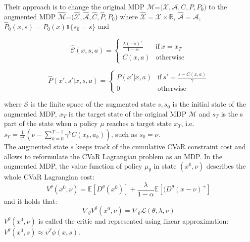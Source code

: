 Their approach is to change the original MDP $\mathcal{M}$=$\mathcal{(X,A},C,P,P_0)$
to the augmented MDP $\mathcal{\hat{M}}$=$\mathcal{(\hat{X},\hat{A}},\hat{C},\hat{P},\hat{P}_0)$ 
where $\mathcal{\hat{X}=X} \times \mathbb R$, $\mathcal{\hat{A}=A}$, $\hat{P}_0(x,s)=P_0(x)\mathds{1}\{s_0=s\}$ and

\begin{equation}
    \mathcal{\hat{C}}(x,s,a)  = \left\{
	    \begin{array}{ll}
		 \frac{\lambda(-s)^+}{1-\alpha}      & \mathrm{if\ } x=x_T \\
		 C(x,a)                                & \mathrm{otherwise }
	    \end{array}
	     \right.
\end{equation}

\begin{equation}
    \hat{P}(x',s'|x,s,a)  = \left\{
	    \begin{array}{ll}
		 P(x'|x,a)      & \mathrm{if\ } s'=\frac{s-C(x,a)}{\gamma} \\
		 0                           & \mathrm{otherwise }
	    \end{array}
	     \right.
\end{equation}

where $\mathcal{S}$ is the finite space of the augmented state $s, s_0$ is the initial state of the augmented
MDP, $x_T$ is the target state of the original MDP $\mathcal{M}$ and $s_T$ is the s part of the state when a policy $\mu$
reaches a target state $x_T$, i.e. $s_T=\frac{1}{\gamma^T}(\nu - \sum_{k=0}^{T-1}\gamma^kC(x_k,a_k))$, such as 
$s_0=\nu$.\\
The augmented state $s$ keeps track of the cumulative CVaR constraint cost and allows to
reformulate the CVaR Lagrangian problem as an MDP.
In the augmented MDP, the value function of policy $\mu_\theta$ in state $(x^0,\nu)$
describes the whole CVaR Lagrangian cost:
\begin{equation}
    V^\theta(x^0,\nu) = \mathbb E [D^\theta(x^0)] + \frac{\lambda}{1-\alpha}\mathbb E[(D^\theta(x-\nu)^+]
\end{equation}
and it holds that:
\begin{equation}
    \nabla_\theta  V^\theta(x^0,\nu)  = \nabla_\theta \mathcal{L}(\theta,\lambda,\nu)
\end{equation}
$V^\theta(x^0,\nu)$ is called the critic and represented using linear approximation: $V^\theta(x^0,s) \approx  v^T\phi(x,s)$.


